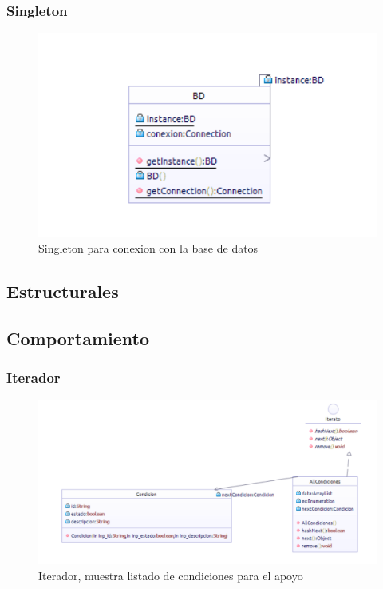 \clearpage

\subsubsection{Singleton}
\begin{figure}[th!]
	\centering
	\includegraphics[width=1.2\linewidth]{uml/Patrones/Singleton}
	\caption{Singleton para conexion con la base de datos}
	\label{fig:Singleton}
\end{figure}

\clearpage



\newpage

\subsection{Estructurales}

\newpage

\subsection{Comportamiento}

\subsubsection{Iterador}
\begin{figure}[th!]
	\centering
	\includegraphics[width=1.2\linewidth]{uml/Patrones/Iterador}
	\caption{Iterador, muestra listado de condiciones para el apoyo}
	\label{fig:Iterador}
\end{figure}
\newpage
